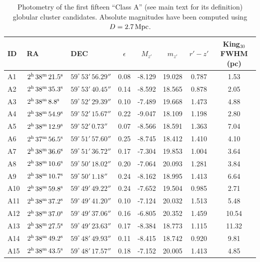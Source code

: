 \documentclass[useAMS,usenatbib]{mn2e}
\begin{document}
\begin{table}
 \centering
 \caption{Photometry of the first fifteen ``Class A'' (see main text for its definition) globular cluster candidates. Absolute magnitudes have been computed using $D = 2.7\,\rm{Mpc}$.}
\label{tab:class_a}  
\begin{tabular}{lllccccc}
	\hline
	ID & RA & DEC & $\epsilon$ & $M_{z'}$ & $m_{z'}$ & $r'-z'$ & King$_{30}$ FWHM (pc) \\
	\hline
	A1 & $2^{\rm{h}}\,38^{\rm{m}}\,21.5^{\rm{s}}$ & $59^\circ\,53'\,56.29''$ & 0.08 & -8.129 & 19.028 & 0.787 & 1.53 \\
	A2 & $2^{\rm{h}}\,38^{\rm{m}}\,35.3^{\rm{s}}$ & $59^\circ\,53'\,40.45''$ & 0.14 & -8.592 & 18.565 & 0.878 & 2.05 \\
	A3 & $2^{\rm{h}}\,38^{\rm{m}}\,8.8^{\rm{s}}$ & $59^\circ\,52'\,29.39''$ & 0.10 & -7.489 & 19.668 & 1.473 & 4.88 \\
	A4 & $2^{\rm{h}}\,38^{\rm{m}}\,54.9^{\rm{s}}$ & $59^\circ\,52'\,15.67''$ & 0.22 & -9.047 & 18.109 & 1.198 & 2.80 \\
	A5 & $2^{\rm{h}}\,38^{\rm{m}}\,12.9^{\rm{s}}$ & $59^\circ\,52'\,0.73''$ & 0.07 & -8.566 & 18.591 & 1.363 & 7.04 \\
	A6 & $2^{\rm{h}}\,37^{\rm{m}}\,56.5^{\rm{s}}$ & $59^\circ\,51'\,57.60''$ & 0.25 & -8.745 & 18.412 & 1.410 & 4.10 \\
	A7 & $2^{\rm{h}}\,38^{\rm{m}}\,36.6^{\rm{s}}$ & $59^\circ\,51'\,36.72''$ & 0.17 & -7.304 & 19.853 & 1.004 & 3.64 \\
	A8 & $2^{\rm{h}}\,38^{\rm{m}}\,10.6^{\rm{s}}$ & $59^\circ\,50'\,18.02''$ & 0.20 & -7.064 & 20.093 & 1.281 & 3.84 \\
	A9 & $2^{\rm{h}}\,38^{\rm{m}}\,10.7^{\rm{s}}$ & $59^\circ\,50'\,1.18''$ & 0.24 & -8.162 & 18.995 & 1.413 & 6.64 \\
	A10 & $2^{\rm{h}}\,38^{\rm{m}}\,59.8^{\rm{s}}$ & $59^\circ\,49'\,49.22''$ & 0.24 & -7.652 & 19.504 & 0.985 & 2.71 \\
	A11 & $2^{\rm{h}}\,38^{\rm{m}}\,37.2^{\rm{s}}$ & $59^\circ\,49'\,41.20''$ & 0.10 & -7.124 & 20.032 & 1.513 & 5.48 \\
	A12 & $2^{\rm{h}}\,38^{\rm{m}}\,37.0^{\rm{s}}$ & $59^\circ\,49'\,37.06''$ & 0.16 & -6.805 & 20.352 & 1.459 & 10.54 \\
	A13 & $2^{\rm{h}}\,38^{\rm{m}}\,27.5^{\rm{s}}$ & $59^\circ\,49'\,23.63''$ & 0.17 & -8.384 & 18.773 & 1.115 & 11.32 \\
	A14 & $2^{\rm{h}}\,38^{\rm{m}}\,49.2^{\rm{s}}$ & $59^\circ\,48'\,49.93''$ & 0.11 & -8.415 & 18.742 & 0.920 & 9.81 \\
	A15 & $2^{\rm{h}}\,38^{\rm{m}}\,43.5^{\rm{s}}$ & $59^\circ\,48'\,17.57''$ & 0.18 & -7.152 & 20.005 & 1.413 & 4.85 \\
	\hline
\end{tabular}
\end{table}
\end{document}
